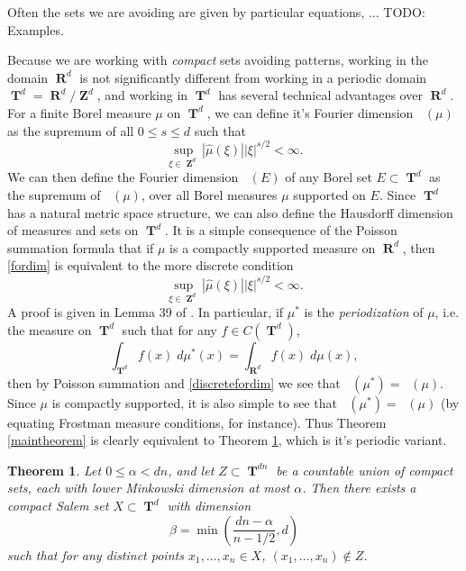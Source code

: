 \documentclass[12pt,reqno]{article}
\numberwithin{equation}{section}
\DeclareMathOperator{\hausdim}{\dim_{\mathbf{H}}}
\DeclareMathOperator{\fordim}{\dim_{\mathbf{F}}}
\DeclareMathOperator{\RR}{\mathbf{R}}
\DeclareMathOperator{\ZZ}{\mathbf{Z}}
\DeclareMathOperator{\TT}{\mathbf{T}}
\newtheorem{theorem}{Theorem}
\numberwithin{theorem}{section}
\begin{document}
Often the sets we are avoiding are given by particular equations, $\dots$ TODO: Examples.

Because we are working with \emph{compact} sets avoiding patterns, working in the domain $\RR^d$ is not significantly different from working in a periodic domain $\TT^d = \RR^d / \ZZ^d$, and working in $\TT^d$ has several technical advantages over $\RR^d$. For a finite Borel measure $\mu$ on $\TT^d$, we can define it's Fourier dimension $\fordim(\mu)$ as the supremum of all $0 \leq s \leq d$ such that
%
\begin{equation}
    \sup_{\xi \in \ZZ^d} |\widehat{\mu}(\xi)| |\xi|^{s/2} < \infty.
\end{equation}
%
We can then define the Fourier dimension $\fordim(E)$ of any Borel set $E \subset \TT^d$ as the supremum of $\fordim(\mu)$, over all Borel measures $\mu$ supported on $E$. Since $\TT^d$ has a natural metric space structure, we can also define the Hausdorff dimension of measures and sets on $\TT^d$. It is a simple consequence of the Poisson summation formula that if $\mu$ is a compactly supported measure on $\RR^d$, then \eqref{fordim} is equivalent to the more discrete condition
%
\begin{equation} \label{discretefordim}
    \sup_{\xi \in \ZZ^d} |\widehat{\mu}(\xi)| |\xi|^{s/2} < \infty.
\end{equation}
%
A proof is given in Lemma 39 of \cite{myThesis}. In particular, if $\mu^*$ is the \emph{periodization} of $\mu$, i.e. the measure on $\TT^d$ such that for any $f \in C(\TT^d)$,
%
\begin{equation}
    \int_{\TT^d} f(x)\; d\mu^*(x) = \int_{\RR^d} f(x)\; d\mu(x),
\end{equation}
%
then by Poisson summation and \eqref{discretefordim} we see that $\fordim(\mu^*) = \fordim(\mu)$. Since $\mu$ is compactly supported, it is also simple to see that $\hausdim(\mu^*) = \hausdim(\mu)$ (by equating Frostman measure conditions, for instance). Thus Theorem \ref{maintheorem} is clearly equivalent to Theorem \ref{periodictheorem}, which is it's periodic variant.

\begin{theorem} \label{periodictheorem}
    Let $0 \leq \alpha < dn$, and let $Z \subset \TT^{dn}$ be a countable union of compact sets, each with lower Minkowski dimension at most $\alpha$. Then there exists a compact Salem set $X \subset \TT^d$ with dimension
    \[ \beta = \min \left( \frac{dn - \alpha}{n-1/2}, d \right) \]
    such that for any distinct points $x_1, \dots, x_n \in X$, $(x_1, \dots, x_n) \not \in Z$.
\end{theorem}
\end{document}
